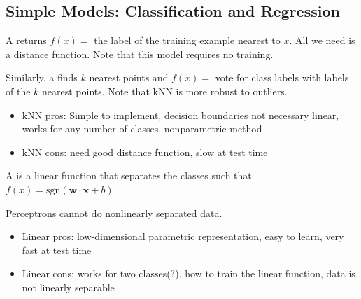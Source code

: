 \documentclass[12pt]{scrartcl}
\begin{document}
\subsection{Simple Models: Classification and Regression}

\begin{definition}
  A  returns $f(x) = $ the label of the training example nearest to $x$. 
  All we need is a distance function. Note that this model requires no training. 

  \hfill

  Similarly, a  finds $k$ nearest points and $f(x) = $ vote for class labels
  with labels of the $k$ nearest points. Note that kNN is more robust to outliers.
\end{definition}

\begin{itemize}
  \item kNN pros: Simple to implement, decision boundaries not necessary linear, 
works for any number of classes, nonparametric method
  \item kNN cons: need good distance function, slow at test time
\end{itemize}

\begin{definition}
  A  is a linear function that separates the classes such that 
  $f(x) = \text{sgn}(\textbf{w} \cdot \textbf{x} + b)$.
\end{definition}

\begin{note}
  Perceptrons cannot do nonlinearly separated data. 
\end{note}

\begin{itemize}
  \item Linear pros: low-dimensional parametric representation, easy to learn, very fast at test time
  \item Linear cons: works for two classes(?), how to train the linear function, data is not linearly separable
\end{itemize}
\end{document}
